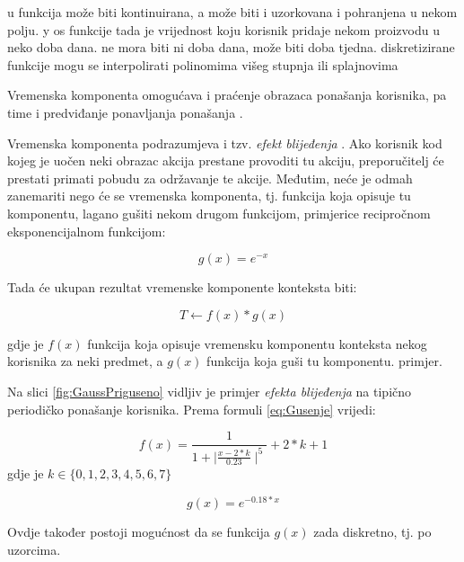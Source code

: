 \documentclass[times, utf8, diplomski, numeric]{fer}
\begin{document}
u funkcija može biti kontinuirana, a može biti i uzorkovana i
pohranjena u nekom polju. y os funkcije tada je vrijednost koju korisnik
pridaje nekom proizvodu u neko doba dana. ne mora biti ni doba dana, može biti
doba tjedna. diskretizirane funkcije mogu se interpolirati polinomima višeg
stupnja ili splajnovima

Vremenska komponenta omogućava i praćenje obrazaca ponašanja korisnika, pa time
i predviđanje ponavljanja ponašanja .

Vremenska komponenta podrazumjeva i tzv. \emph{efekt blijeđenja} . Ako korisnik kod kojeg je uočen neki obrazac akcija prestane provoditi
tu akciju, preporučitelj će prestati primati pobudu za održavanje te akcije.
Međutim, neće je odmah zanemariti nego će se vremenska komponenta, tj. funkcija
koja opisuje tu komponentu, lagano gušiti nekom drugom funkcijom, primjerice
recipročnom eksponencijalnom funkcijom:

\begin{equation}
	\label{eq:RecipExp}
	g(x) = e^{-x}
\end{equation}

Tada će ukupan rezultat vremenske komponente konteksta biti:

\begin{equation}
	\label{eq:Gusenje}
	T \leftarrow f(x) \ast g(x)
\end{equation}

gdje je $f(x)$ funkcija koja opisuje vremensku komponentu konteksta nekog
korisnika za neki predmet, a $g(x)$ funkcija koja guši tu komponentu.
primjer. 

Na slici \ref{fig:GaussPriguseno} vidljiv je primjer \emph{efekta
blijeđenja} na tipično periodičko ponašanje korisnika. Prema formuli
\ref{eq:Gusenje} vrijedi:

\begin{equation}
	\label{eq:BellFunc}
	f(x) = \frac
	{
		1
	}
	{
		1 + \mid\frac{x - 2*k}{0.23}\mid^{5}
	}
	+ 2 \ast k + 1
\end{equation}
gdje je $k \in \{ 0, 1, 2, 3, 4, 5, 6, 7 \}$

\begin{equation}
	\label{eq:Prigusnica}
	g(x)=e^{-0.18 * x}
\end{equation}

Ovdje također postoji mogućnost da se funkcija $g(x)$ zada diskretno, tj. po
uzorcima.
\end{document}
